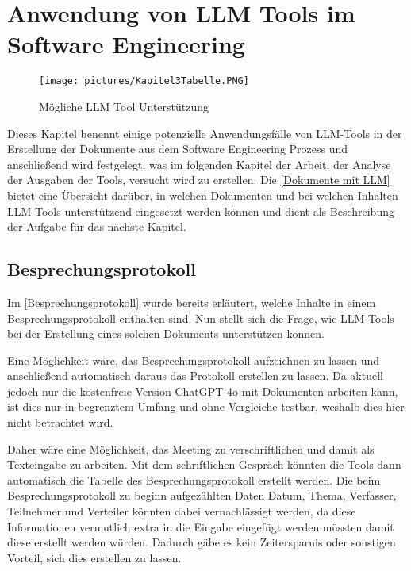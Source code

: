 \chapter{Anwendung von LLM Tools im Software Engineering} 

\begin{figure}
    \centering
    \texttt{[image: pictures/Kapitel3Tabelle.PNG]}
    \caption{Mögliche LLM Tool Unterstützung}
    \label{Dokumente mit LLM}
\end{figure}

Dieses Kapitel benennt einige potenzielle Anwendungsfälle von LLM-Tools in der Erstellung der Dokumente aus dem 
Software Engineering Prozess und anschließend wird festgelegt, was im folgenden Kapitel der Arbeit, der Analyse 
der Ausgaben der Tools, versucht wird zu erstellen. Die \autoref{Dokumente mit LLM} bietet eine Übersicht 
darüber, in welchen Dokumenten und bei welchen Inhalten LLM-Tools unterstützend eingesetzt 
werden können und dient als Beschreibung der Aufgabe für das nächste Kapitel.

\section{Besprechungsprotokoll}  \label{LLMBesprechungsprotokoll}

Im \autoref{Besprechungsprotokoll} wurde bereits erläutert, welche Inhalte in einem Besprechungsprotokoll enthalten 
sind. Nun stellt sich die Frage, wie LLM-Tools bei der Erstellung eines solchen Dokuments unterstützen können.

Eine Möglichkeit wäre, das Besprechungsprotokoll aufzeichnen zu lassen und anschließend automatisch daraus das Protokoll 
erstellen zu lassen. Da aktuell jedoch nur die kostenfreie Version ChatGPT-4o mit Dokumenten arbeiten kann, ist dies 
nur in begrenztem Umfang und ohne Vergleiche testbar, weshalb dies hier nicht betrachtet wird.

Daher wäre eine Möglichkeit, das Meeting zu verschriftlichen und damit als Texteingabe zu arbeiten. Mit dem 
schriftlichen Gespräch könnten die Tools dann automatisch die Tabelle des Besprechungsprotokoll erstellt 
werden. Die beim Besprechungsprotokoll zu beginn aufgezählten Daten  Datum, Thema, Verfasser, Teilnehmer 
und Verteiler könnten dabei 
vernachlässigt werden, da diese Informationen vermutlich extra in die Eingabe eingefügt werden müssten damit 
diese erstellt werden würden. Dadurch gäbe es kein Zeitersparnis oder sonstigen Vorteil, sich dies erstellen 
zu lassen.


